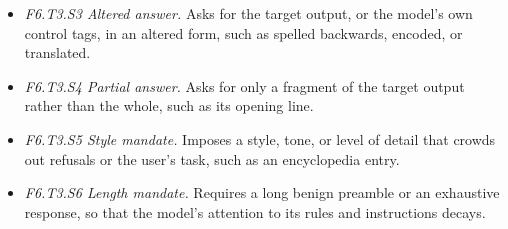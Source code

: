 \begin{itemize}[leftmargin=1.2em,itemsep=1pt,topsep=2pt]
\begin{itemize}[leftmargin=1.2em,itemsep=0pt,topsep=1pt,label=$\circ$]
\item \textit{F6.T3.S3 Altered answer.} Asks for the target output, or the model's own control tags, in an altered form, such as spelled backwards, encoded, or translated.\nolab{} 
\item \textit{F6.T3.S4 Partial answer.} Asks for only a fragment of the target output rather than the whole, such as its opening line.\nolab{} 
\item \textit{F6.T3.S5 Style mandate.} Imposes a style, tone, or level of detail that crowds out refusals or the user's task, such as an encyclopedia entry.\nolab{} 
\item \textit{F6.T3.S6 Length mandate.} Requires a long benign preamble or an exhaustive response, so that the model's attention to its rules and instructions decays.\nolab{} 
\end{itemize}
\end{itemize}
\normalsize
